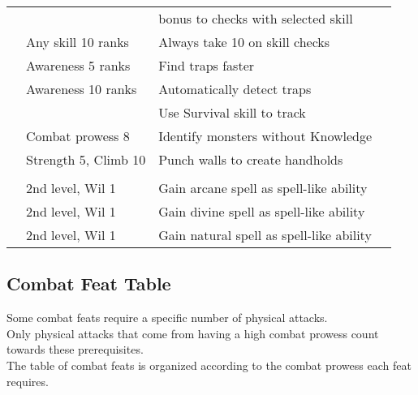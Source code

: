 \begin{longtabuwrapper}
\begin{longtabu}{>{\lcol}p{10em} >{\lcol}p{15em} >{\lcol}X >{\lcol}p{3em}}
         & \x &   bonus to checks with selected skill &  \\
         & Any skill 10 ranks & Always take 10 on skill checks &  \\
         & Awareness 5 ranks & Find traps faster &  \\
         & Awareness 10 ranks & Automatically detect traps &  \\
         & \x &  Use Survival skill to track &  \\
         & Combat prowess 8 & Identify monsters without Knowledge &  \\
         & Strength 5, Climb 10 & Punch walls to create handholds &  \\

        \midrule
         &  &  &  \\
         & 2nd level, Wil 1 & Gain arcane spell as spell-like ability &  \\
         & 2nd level, Wil 1 & Gain divine spell as spell-like ability &  \\
         & 2nd level, Wil 1 & Gain natural spell as spell-like ability &  \\

    \end{longtabu}
\end{longtabuwrapper}

\subsection{Combat Feat Table}\label{cap:Combat Feats}

Some combat feats require a specific number of physical attacks.\\
Only physical attacks that come from having a high combat prowess count towards these prerequisites.\\
The table of combat feats is organized according to the combat prowess each feat requires.\\

